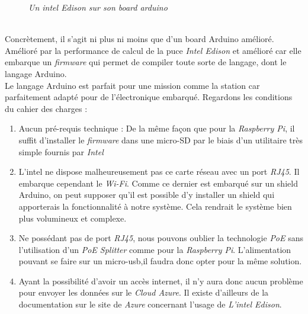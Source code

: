 \begin{figure}[H]
\begin{center}
\end{center}
		\caption{ \textit{Un intel Edison sur son board arduino}}
\end{figure}\\

Concrètement, il s'agit ni plus ni moins que d'un board Arduino amélioré. Amélioré par la performance de calcul de la puce \textit{Intel Edison} et amélioré car elle embarque un \textit{firmware} qui permet de compiler toute sorte de langage, dont le langage Arduino.\\

Le langage Arduino est parfait pour une mission comme la station car parfaitement adapté pour de l'électronique embarqué. Regardons les conditions du cahier des charges : 

\begin{enumerate}
\item Aucun pré-requis technique : De la même façon que pour la \textit{Raspberry Pi}, il suffit d'installer le \textit{firmware} dans une micro-SD par le biais d'un utilitaire très simple fournis par \textit{Intel}

\item L'intel ne dispose malheureusement pas ce carte réseau avec un port \textit{RJ45}. Il embarque cependant le \textit{Wi-Fi}. Comme ce dernier est embarqué sur un shield Arduino, on peut supposer qu'il est possible d'y installer un shield qui apporterais la fonctionnalité à notre système. Cela rendrait le système bien plus volumineux et complexe.

\item Ne possédant pas de port \textit{RJ45}, nous pouvons oublier la technologie \textit{PoE} sans l'utilisation d'un \textit{PoE Splitter} comme pour la \textit{Raspberry Pi}. L'alimentation pouvant se faire sur un micro-usb,il faudra donc opter pour la même solution.

\item Ayant la possibilité d'avoir un accès internet, il n'y aura donc aucun problème pour envoyer les données sur le \textit{Cloud Azure}. Il existe d'ailleurs de la documentation sur le site de \textit{Azure} concernant l'usage de \textit{L'intel Edison}.
\end{enumerate}


